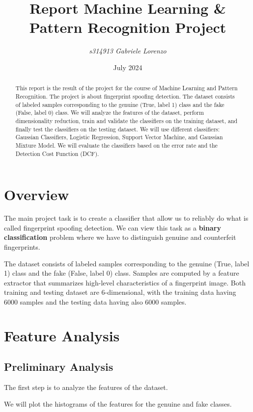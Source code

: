 \documentclass[12pt]{report}
\title{\textbf{Report Machine Learning \& Pattern Recognition Project}}
\author{\textit{s314913 Gabriele Lorenzo}}
\date{July 2024}
\newcommand{\nnl}{%
    \newline
    \newline
}
\begin{document}
\maketitle

\begin{abstract}
    This report is the result of the project for the course of Machine Learning and Pattern Recognition. The project is about fingerprint spoofing detection. The dataset consists of labeled samples corresponding to the genuine (True, label 1) class and the fake (False, label 0) class. We will analyze the features of the dataset, perform dimensionality reduction, train and validate the classifiers on the training dataset, and finally test the classifiers on the testing dataset. We will use different classifiers: Gaussian Classifiers, Logistic Regression, Support Vector Machine, and Gaussian Mixture Model. We will evaluate the classifiers based on the error rate and the Detection Cost Function (DCF).
\end{abstract}

\tableofcontents

\chapter{Overview}
The main project task is to create a classifier that allow us to reliably do what is called fingerprint spoofing detection.
We can view this task as a \textbf{binary classification} problem where we have to distinguish genuine and counterfeit fingerprints.
\nnl
The dataset consists of labeled samples corresponding to the genuine (True, label 1) class and the fake (False, label 0) class.
Samples are computed by a feature extractor that summarizes high-level characteristics of a fingerprint image.
Both training and testing dataset are 6-dimensional, with the training data having 6000 samples and the testing data having also 6000 samples.

\chapter{Feature Analysis}
\section{Preliminary Analysis}
The first step is to analyze the features of the dataset.
\nnl
We will plot the histograms of the features for the genuine and fake classes.
\end{document}
